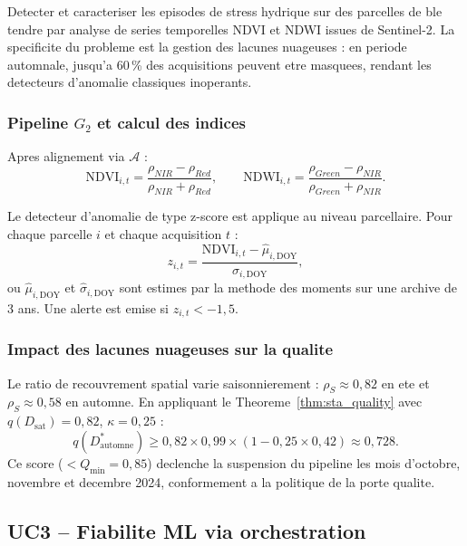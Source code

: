 \documentclass[12pt,a4paper]{article}
\theoremstyle{plain}
\theoremstyle{definition}
\theoremstyle{remark}
\begin{document}
	Detecter et caracteriser les episodes de stress hydrique sur des
	parcelles de ble tendre par analyse de series temporelles NDVI et NDWI
	issues de Sentinel-2. La specificite du probleme est la gestion des
	lacunes nuageuses : en periode automnale, jusqu'a 60\,\% des acquisitions
	peuvent etre masquees, rendant les detecteurs d'anomalie classiques
	inoperants.
	
	\subsubsection{Pipeline $G_2$ et calcul des indices}
	
	Apres alignement via $\mathcal{A}$ :
	\begin{equation}
		\text{NDVI}_{i,t} = \frac{\rho_{NIR} - \rho_{Red}}{\rho_{NIR} + \rho_{Red}},
		\qquad
		\text{NDWI}_{i,t} = \frac{\rho_{Green} - \rho_{NIR}}{\rho_{Green} + \rho_{NIR}}.
		\label{eq:indices}
	\end{equation}
	
	Le detecteur d'anomalie de type z-score est applique au niveau parcellaire.
	Pour chaque parcelle $i$ et chaque acquisition $t$ :
	\begin{equation}
		z_{i,t} = \frac{\text{NDVI}_{i,t} - \hat\mu_{i,\text{DOY}}}
		{\hat\sigma_{i,\text{DOY}}},
		\label{eq:zscore}
	\end{equation}
	ou $\hat\mu_{i,\text{DOY}}$ et $\hat\sigma_{i,\text{DOY}}$ sont estimes
	par la methode des moments sur une archive de 3 ans. Une alerte est
	emise si $z_{i,t} < -1{,}5$.
	
	\subsubsection{Impact des lacunes nuageuses sur la qualite}
	
	Le ratio de recouvrement spatial varie saisonnierement :
	$\rho_S \approx 0{,}82$ en ete et $\rho_S \approx 0{,}58$ en automne.
	En appliquant le Theoreme~\ref{thm:sta_quality} avec
	$q(D_{\text{sat}}) = 0{,}82$, $\kappa=0{,}25$ :
	\begin{equation}
		q(D^*_{\text{automne}}) \geq 0{,}82 \times 0{,}99 \times
		(1 - 0{,}25 \times 0{,}42) \approx 0{,}728.
		\label{eq:uc2_qual}
	\end{equation}
	Ce score ($<Q_{\min}=0{,}85$) declenche la suspension du pipeline les
	mois d'octobre, novembre et decembre 2024, conformement a la politique
	de la porte qualite.
	
	\subsection{UC3 -- Fiabilite ML via orchestration}
	\label{subsec:uc3}
	
\end{document}
